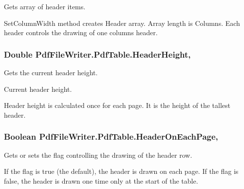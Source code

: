 Gets array of header items. 

Set\+Column\+Width method creates Header array. Array length is Columns. Each header controls the drawing of one column\textquotesingle{}s header. 
\subsubsection[{\texorpdfstring{Header\+Height}{HeaderHeight}}]{\setlength{\rightskip}{0pt plus 5cm}Double Pdf\+File\+Writer.\+Pdf\+Table.\+Header\+Height\hspace{0.3cm}{\ttfamily [get]}, {\ttfamily [set]}}\hypertarget{class_pdf_file_writer_1_1_pdf_table_a6f015bb0d3cba3893e2a95ebcc977045}{}\label{class_pdf_file_writer_1_1_pdf_table_a6f015bb0d3cba3893e2a95ebcc977045}


Gets the current header height. 

Current header height.

Header height is calculated once for each page. It is the height of the tallest header. 
\subsubsection[{\texorpdfstring{Header\+On\+Each\+Page}{HeaderOnEachPage}}]{\setlength{\rightskip}{0pt plus 5cm}Boolean Pdf\+File\+Writer.\+Pdf\+Table.\+Header\+On\+Each\+Page\hspace{0.3cm}{\ttfamily [get]}, {\ttfamily [set]}}\hypertarget{class_pdf_file_writer_1_1_pdf_table_a590e97e8e10d74530bffb85494f11eea}{}\label{class_pdf_file_writer_1_1_pdf_table_a590e97e8e10d74530bffb85494f11eea}


Gets or sets the flag controlling the drawing of the header row. 

If the flag is true (the default), the header is drawn on each page. If the flag is false, the header is drawn one time only at the start of the table. 
